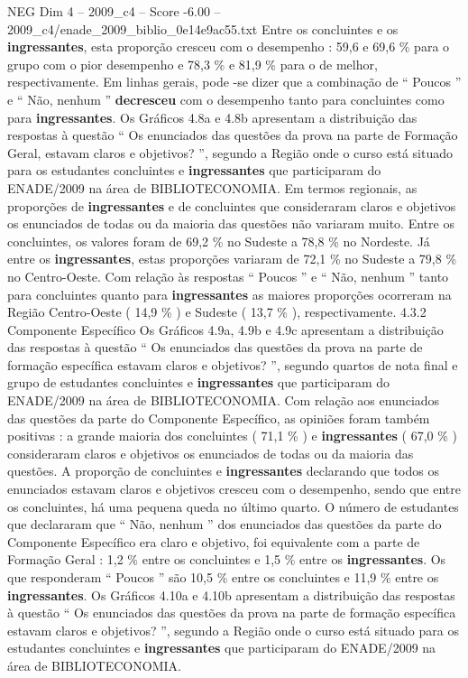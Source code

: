 \begin{textsample}{NEG Dim 4 – 2009\_c4 – Score -6.00 – 2009\_c4/enade\_2009\_biblio\_0e14e9ac55.txt}
Entre os concluintes e os \textbf{ingressantes}, esta proporção cresceu com o desempenho : 59,6 e 69,6 \% para o grupo com o pior desempenho e 78,3 \% e 81,9 \% para o de melhor, respectivamente.
Em linhas gerais, pode -se dizer que a combinação de “ Poucos ” e “ Não, nenhum ” \textbf{decresceu} com o desempenho tanto para concluintes como para \textbf{ingressantes}.
Os Gráficos 4.8a e 4.8b apresentam a distribuição das respostas à questão “ Os enunciados das questões da prova na parte de Formação Geral, estavam claros e objetivos? ”, segundo a Região onde o curso está situado para os estudantes concluintes e \textbf{ingressantes} que participaram do ENADE/2009 na área de BIBLIOTECONOMIA.
Em termos regionais, as proporções de \textbf{ingressantes} e de concluintes que consideraram claros e objetivos os enunciados de todas ou da maioria das questões não variaram muito.
Entre os concluintes, os valores foram de 69,2 \% no Sudeste a 78,8 \% no Nordeste.
Já entre os \textbf{ingressantes}, estas proporções variaram de 72,1 \% no Sudeste a 79,8 \% no Centro-Oeste.
Com relação às respostas “ Poucos ” e “ Não, nenhum ” tanto para concluintes quanto para \textbf{ingressantes} as maiores proporções ocorreram na Região Centro-Oeste ( 14,9 \% ) e Sudeste ( 13,7 \% ), respectivamente. 4.3.2 Componente Específico Os Gráficos 4.9a, 4.9b e 4.9c apresentam a distribuição das respostas à questão “ Os enunciados das questões da prova na parte de formação específica estavam claros e objetivos? ”, segundo quartos de nota final e grupo de estudantes concluintes e \textbf{ingressantes} que participaram do ENADE/2009 na área de BIBLIOTECONOMIA.
Com relação aos enunciados das questões da parte do Componente Específico, as opiniões foram também positivas : a grande maioria dos concluintes ( 71,1 \% ) e \textbf{ingressantes} ( 67,0 \% ) consideraram claros e objetivos os enunciados de todas ou da maioria das questões.
A proporção de concluintes e \textbf{ingressantes} declarando que todos os enunciados estavam claros e objetivos cresceu com o desempenho, sendo que entre os concluintes, há uma pequena queda no último quarto.
O número de estudantes que declararam que “ Não, nenhum ” dos enunciados das questões da parte do Componente Específico era claro e objetivo, foi equivalente com a parte de Formação Geral : 1,2 \% entre os concluintes e 1,5 \% entre os \textbf{ingressantes}.
Os que responderam “ Poucos ” são 10,5 \% entre os concluintes e 11,9 \% entre os \textbf{ingressantes}.
Os Gráficos 4.10a e 4.10b apresentam a distribuição das respostas à questão “ Os enunciados das questões da prova na parte de formação específica estavam claros e objetivos? ”, segundo a Região onde o curso está situado para os estudantes concluintes e \textbf{ingressantes} que participaram do ENADE/2009 na área de BIBLIOTECONOMIA.

\end{textsample}
